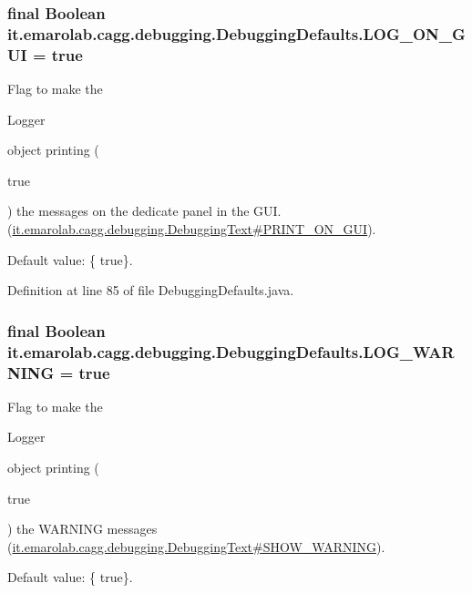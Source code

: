 \hypertarget{classit_1_1emarolab_1_1cagg_1_1debugging_1_1DebuggingDefaults_a82d4435a02f409eff194853e9ae63499}{
\subsubsection[{L\-O\-G\-\_\-\-O\-N\-\_\-\-G\-U\-I}]{\setlength{\rightskip}{0pt plus 5cm}final Boolean it.\-emarolab.\-cagg.\-debugging.\-Debugging\-Defaults.\-L\-O\-G\-\_\-\-O\-N\-\_\-\-G\-U\-I = true\hspace{0.3cm}{\ttfamily [static]}}}\label{classit_1_1emarolab_1_1cagg_1_1debugging_1_1DebuggingDefaults_a82d4435a02f409eff194853e9ae63499}
Flag to make the
\begin{DoxyCode}
Logger 
\end{DoxyCode}
 object printing (
\begin{DoxyCode}
\textcolor{keyword}{true} 
\end{DoxyCode}
 ) the messages on the dedicate panel in the G\-U\-I. (\hyperlink{}{it.\-emarolab.\-cagg.\-debugging.\-Debugging\-Text\#\-P\-R\-I\-N\-T\-\_\-\-O\-N\-\_\-\-G\-U\-I}).\par
 Default value\-: \{ true\}. 

Definition at line 85 of file Debugging\-Defaults.\-java.

\hypertarget{classit_1_1emarolab_1_1cagg_1_1debugging_1_1DebuggingDefaults_a609da8270808ac3bf908af33bd454c36}{
\subsubsection[{L\-O\-G\-\_\-\-W\-A\-R\-N\-I\-N\-G}]{\setlength{\rightskip}{0pt plus 5cm}final Boolean it.\-emarolab.\-cagg.\-debugging.\-Debugging\-Defaults.\-L\-O\-G\-\_\-\-W\-A\-R\-N\-I\-N\-G = true\hspace{0.3cm}{\ttfamily [static]}}}\label{classit_1_1emarolab_1_1cagg_1_1debugging_1_1DebuggingDefaults_a609da8270808ac3bf908af33bd454c36}
Flag to make the
\begin{DoxyCode}
Logger 
\end{DoxyCode}
 object printing (
\begin{DoxyCode}
\textcolor{keyword}{true} 
\end{DoxyCode}
 ) the W\-A\-R\-N\-I\-N\-G messages (\hyperlink{}{it.\-emarolab.\-cagg.\-debugging.\-Debugging\-Text\#\-S\-H\-O\-W\-\_\-\-W\-A\-R\-N\-I\-N\-G}).\par
 Default value\-: \{ true\}. 

